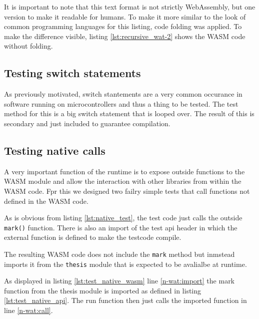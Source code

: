 It is important to note that this text format is not strictly WebAssembly, but one version to make it readable for humans. To make it more similar to the look of common programming languages for this listing, code folding was applied. To make the difference visible, listing \ref{lst:recursive_wat-2} shows the WASM code without folding.


\subsection{Testing switch statements}
%
As previously motivated, switch stantements are a very common occurance in software running on microcontrollers and thus a thing to be tested. The test method for this is a big switch statement that is looped over. The result of this is secondary and just included to guarantee compilation.

\subsection{Testing native calls}\label{subsec:native}
A very important function of the runtime is to expose outside functions to the WASM module and allow the interaction with other libraries from within the WASM code. Fpr this we designed two failry simple tests that call functions not defined in the WASM code.

As is obvious from listing \ref{lst:native_test}, the test code just calls the outside \lstinline{mark()} function. There is also an import of the test api header in which the external function is defined to make the testcode compile.

The resulting WASM code does not include the \lstinline{mark} method but inmstead imports it from the \lstinline{thesis} module that is expected to be avalialbe at runtime.

As displayed in listing \ref{lst:test_native_wasm} line \ref{n-wat:import} the mark function from the thesis module is imported as defined in listing \ref{lst:test_native_api}. The run function then just calls the imported function in line \ref{n-wat:call}.

